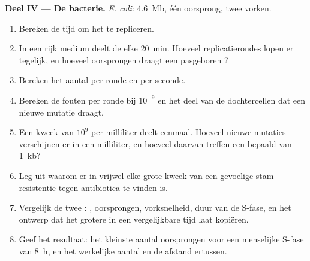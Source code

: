 \begin{problem}
\medskip
\noindent\textbf{Deel IV --- De bacterie.}
\emph{E. coli}: \qty{4.6}{Mb}, één oorsprong, twee vorken.
\begin{enumerate}[resume]
  \item Bereken de tijd om het  te repliceren.
  \item In een rijk medium deelt de  elke \qty{20}{min}. Hoeveel
        replicatierondes lopen er tegelijk, en hoeveel oorsprongen draagt
        een pasgeboren ?
  \item Bereken het aantal  per ronde en per seconde.
  \item Bereken de fouten per ronde bij $10^{-9}$ en het deel van de
        dochtercellen dat een nieuwe mutatie draagt.
  \item Een kweek van $10^9$  per milliliter deelt eenmaal. Hoeveel
        nieuwe mutaties verschijnen er in een milliliter, en hoeveel
        daarvan treffen een bepaald  van \qty{1}{kb}?
  \item Leg uit waarom er in vrijwel elke grote kweek van een gevoelige
        stam resistentie tegen antibiotica te vinden is.
  \item Vergelijk de twee : , oorsprongen, vorksnelheid,
        duur van de S-fase, en het ontwerp dat het grotere  in een
        vergelijkbare tijd laat kopiëren.
  \item Geef het resultaat: het kleinste aantal oorsprongen voor een
        menselijke S-fase van \qty{8}{h}, en het werkelijke aantal en de
        afstand ertussen.
\end{enumerate}
\end{problem}
